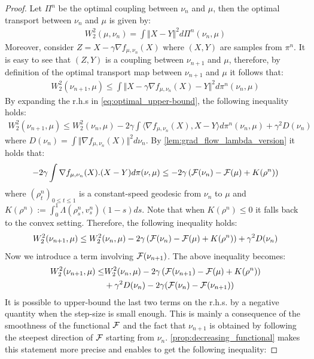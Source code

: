 \begin{proof}
	Let $\Pi^n$ be the optimal coupling between $\nu_n$ and $\mu$, then the optimal transport between $\nu_n$ and $\mu$ is given by:
	\begin{align}
	W_2^2(\mu,\nu_n)=\int \Vert X-Y \Vert^2 d\Pi^n(\nu_n,\mu)
	\end{align}
	Moreover, consider $Z=X-\gamma \nabla f_{\mu, \nu_n}(X)$ where $(X,Y)$ are samples from $\pi^n$. It is easy to see that $(Z,Y)$ is a coupling between $\nu_{n+1}$ and $\mu$, therefore, by definition of the optimal transport map between $\nu_{n+1}$ and $\mu$ it follows that:
	\begin{align}\label{eq:optimal_upper-bound}
	W_2^2(\nu_{n+1},\mu)\leq \int \Vert X-\gamma \nabla f_{\mu, \nu_n}(X)-Y\Vert^2 d\pi^n(\nu_n,\mu)
	\end{align}
	By expanding the r.h.s in \cref{eq:optimal_upper-bound}, the following inequality holds:
	\begin{align}\label{eq:main_inequality}
	W_2^2(\nu_{n+1},\mu)\leq W_2^2(\nu_{n},\mu) -2\gamma \int \langle \nabla f_{\mu, \nu_n}(X), X-Y \rangle d\pi^n(\nu_n,\mu)+ \gamma^2D(\nu_n)
	\end{align}
	where $D(\nu_n) = \int \Vert \nabla f_{\mu, \nu_n}(X)\Vert^2 d\nu_n $.
	By \cref{lem:grad_flow_lambda_version} it holds that:
	\begin{align}\label{eq:flow_upper-bound}
	-2\gamma \int  \nabla f_{\mu, \nu_n}(X).(X-Y) d\pi(\nu,\mu)
	\leq
	-2\gamma\left({{\mathcal F}}(\nu_n)- {{\mathcal F}}(\mu) +K(\rho^n)\right)
	\end{align}
	where $(\rho^n_t)_{0\leq t \leq 1}$ is a constant-speed geodesic from $\nu_n$ to $\mu$ and $K(\rho^n):=\int_0^1 \Lambda(\rho^n_s,v^n_s)(1-s)ds$. %
	Note that when $K(\rho^n)\leq 0$ it falls back to the convex setting.
	Therefore, the following inequality holds:
	\begin{align}
	W_2^2(\nu_{n+1},\mu)\leq W_2^2(\nu_{n},\mu) - 2\gamma\left({{\mathcal F}}(\nu_n)- {{\mathcal F}}(\mu) +K(\rho^n)\right) +\gamma^2 D(\nu_n)
	\end{align}
	Now we introduce a term involving ${{\mathcal F}}(\nu_{n+1})$. The above inequality becomes:
	\begin{align}
	W_2^2(\nu_{n+1},\mu)\leq & W_2^2(\nu_{n},\mu) - 2\gamma\left({{\mathcal F}}(\nu_{n+1})- {{\mathcal F}}(\mu) +K(\rho^n)\right) \\
	&+\gamma^2 D(\nu_n) -2\gamma ({{\mathcal F}}(\nu_n)-{{\mathcal F}}(\nu_{n+1}))
	\label{eq:main_ineq_2}
	\end{align}
	It is possible to upper-bound the last two terms on the r.h.s. by a negative quantity when the step-size is small enough. This is mainly a consequence of the smoothness of the functional ${{\mathcal F}}$ and the fact that $\nu_{n+1}$ is obtained by following the steepest direction of ${{\mathcal F}}$ starting from $\nu_n$. \cref{prop:decreasing_functional} makes this statement more precise and enables to get the following inequality:

\end{proof}
